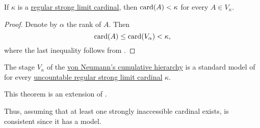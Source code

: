 \begin{corollary}\label{thm:strong_regular_cardinal_stage_cardinality}
  If \( \kappa \) is a \hyperref[rem:strongly_inaccessible_cardinal]{regular strong limit cardinal}, then \( \operatorname{card}(A) < \kappa \) for every \( A \in V_\kappa \).
\end{corollary}
\begin{proof}
  Denote by \( \alpha \) the rank of \( A \). Then
  \begin{equation*}
    \operatorname{card}(A) \leq \operatorname{card}(V_\alpha) < \kappa,
  \end{equation*}
  where the last inequality follows from .
\end{proof}

\begin{theorem}\label{thm:cumulative_hierarchy_model_of_zfc}
  The stage \( V_\kappa \) of the \hyperref[def:cumulative_hierarchy]{von Neumann's cumulative hierarchy} is a standard model of  for every \hyperref[rem:strongly_inaccessible_cardinal]{uncountable regular strong limit cardinal} \( \kappa \).

  This theorem is an extension of .

  Thus, assuming that at least one strongly inaccessible cardinal exists,  is consistent since it has a model.
\end{theorem}

